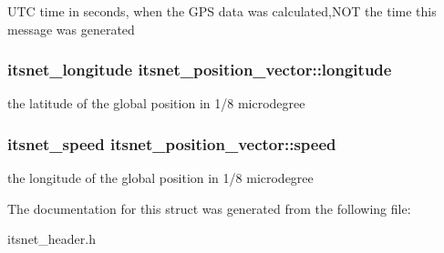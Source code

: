 \-U\-T\-C time in seconds, when the \-G\-P\-S data was calculated,\-N\-O\-T the time this message was generated \hypertarget{structitsnet__position__vector_aebcfbea2a0daa7f7457d75aae1d741f8}{
\subsubsection[{longitude}]{\setlength{\rightskip}{0pt plus 5cm}itsnet\-\_\-longitude {\bf itsnet\-\_\-position\-\_\-vector\-::longitude}}}\label{structitsnet__position__vector_aebcfbea2a0daa7f7457d75aae1d741f8}
the latitude of the global position in 1/8 microdegree \hypertarget{structitsnet__position__vector_af373a8d179ae91c06fdfd765010233ab}{
\subsubsection[{speed}]{\setlength{\rightskip}{0pt plus 5cm}itsnet\-\_\-speed {\bf itsnet\-\_\-position\-\_\-vector\-::speed}}}\label{structitsnet__position__vector_af373a8d179ae91c06fdfd765010233ab}
the longitude of the global position in 1/8 microdegree 

\-The documentation for this struct was generated from the following file\-:\begin{DoxyCompactItemize}
\item 
itsnet\-\_\-header.\-h\end{DoxyCompactItemize}
